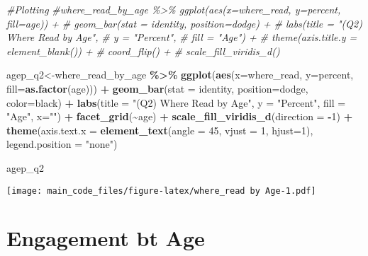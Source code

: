 \documentclass[
]{article}
\newenvironment{Shaded}{\begin{snugshade}}{\end{snugshade}}
\newcommand{\AttributeTok}[1]{\textcolor[rgb]{0.13,0.29,0.53}{#1}}
\newcommand{\CommentTok}[1]{\textcolor[rgb]{0.56,0.35,0.01}{\textit{#1}}}
\newcommand{\DecValTok}[1]{\textcolor[rgb]{0.00,0.00,0.81}{#1}}
\newcommand{\FunctionTok}[1]{\textcolor[rgb]{0.13,0.29,0.53}{\textbf{#1}}}
\newcommand{\NormalTok}[1]{#1}
\newcommand{\OtherTok}[1]{\textcolor[rgb]{0.56,0.35,0.01}{#1}}
\newcommand{\SpecialCharTok}[1]{\textcolor[rgb]{0.81,0.36,0.00}{\textbf{#1}}}
\newcommand{\StringTok}[1]{\textcolor[rgb]{0.31,0.60,0.02}{#1}}
\begin{document}
\begin{Shaded}
\begin{Highlighting}[]
\CommentTok{\#Plotting }
\CommentTok{\#where\_read\_by\_age \%\textgreater{}\% ggplot(aes(x=where\_read, y=percent, fill=age)) +}
\CommentTok{\#  geom\_bar(stat = \textquotesingle{}identity\textquotesingle{}, position=\textquotesingle{}dodge\textquotesingle{}) +}
\CommentTok{\#  labs(title = "(Q2) Where Read by Age",}
\CommentTok{\#       y = "Percent",}
\CommentTok{\#       fill = "Age") +}
\CommentTok{\#  theme(axis.title.y = element\_blank()) +}
 \CommentTok{\# coord\_flip() +}
 \CommentTok{\# scale\_fill\_viridis\_d()}


\NormalTok{agep\_q2}\OtherTok{\textless{}{-}}\NormalTok{where\_read\_by\_age }\SpecialCharTok{\%\textgreater{}\%} \FunctionTok{ggplot}\NormalTok{(}\FunctionTok{aes}\NormalTok{(}\AttributeTok{x=}\NormalTok{where\_read, }\AttributeTok{y=}\NormalTok{percent, }\AttributeTok{fill=}\FunctionTok{as.factor}\NormalTok{(age))) }\SpecialCharTok{+}
  \FunctionTok{geom\_bar}\NormalTok{(}\AttributeTok{stat =} \StringTok{\textquotesingle{}identity\textquotesingle{}}\NormalTok{, }\AttributeTok{position=}\StringTok{\textquotesingle{}dodge\textquotesingle{}}\NormalTok{, }\AttributeTok{color=}\StringTok{\textquotesingle{}black\textquotesingle{}}\NormalTok{) }\SpecialCharTok{+}
  \FunctionTok{labs}\NormalTok{(}\AttributeTok{title =} \StringTok{"(Q2) Where Read by Age"}\NormalTok{,}
       \AttributeTok{y =} \StringTok{"Percent"}\NormalTok{,}
       \AttributeTok{fill =} \StringTok{"Age"}\NormalTok{,}
       \AttributeTok{x=}\StringTok{""}\NormalTok{) }\SpecialCharTok{+}
  \FunctionTok{facet\_grid}\NormalTok{(}\SpecialCharTok{\textasciitilde{}}\NormalTok{age) }\SpecialCharTok{+}
  \FunctionTok{scale\_fill\_viridis\_d}\NormalTok{(}\AttributeTok{direction =} \SpecialCharTok{{-}}\DecValTok{1}\NormalTok{) }\SpecialCharTok{+}
  \FunctionTok{theme}\NormalTok{(}\AttributeTok{axis.text.x =} \FunctionTok{element\_text}\NormalTok{(}\AttributeTok{angle =} \DecValTok{45}\NormalTok{, }\AttributeTok{vjust =} \DecValTok{1}\NormalTok{, }\AttributeTok{hjust=}\DecValTok{1}\NormalTok{),}
        \AttributeTok{legend.position =} \StringTok{"none"}\NormalTok{) }
  
\NormalTok{agep\_q2}
\end{Highlighting}
\end{Shaded}

\texttt{[image: main\_code\_files/figure-latex/where\_read by Age-1.pdf]}

\hypertarget{engagement-bt-age}{%
\section{Engagement bt Age}\label{engagement-bt-age}}
\end{document}
